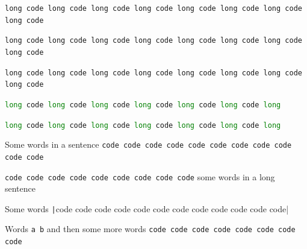 \documentclass{article}
\begin{document}

\lstinline{long code long code long code long code long code long code long code long code}

\lstinline|long code long code long code long code long code long code long code long code|

\lstinline+long code long code long code long code long code long code long code long code+

\lstinline[language=Python]|long code long code long code long code long code long code long|

\lstinline[language=Python]{long code long code long code long code long code long code long}


Some words in a sentence \lstinline{code code code code code code code code code code code}

\lstinline!code code code code code code code code code! some words in a long sentence


Some words \texttt|code code code code code code code code code code code code|


Words \verb|a b| and then some more words \lstinline{code code code code code code code code}
\end{document}
